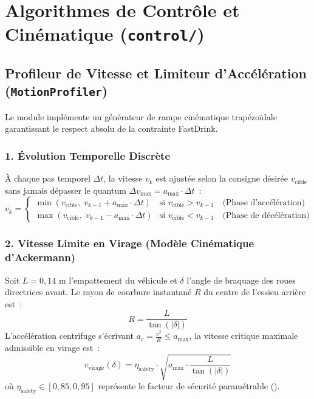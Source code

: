 \section{Algorithmes de Contrôle et Cinématique (\texttt{control/})}

\subsection{Profileur de Vitesse et Limiteur d'Accélération (\texttt{MotionProfiler})}
Le module  implémente un générateur de rampe cinématique trapézoïdale garantissant le respect absolu de la contrainte FastDrink. 

\subsubsection{1. Évolution Temporelle Discrète}
À chaque pas temporel $\Delta t$, la vitesse $v_k$ est ajustée selon la consigne désirée $v_{\text{cible}}$ sans jamais dépasser le quantum $\Delta v_{\max} = a_{\max} \cdot \Delta t$~:
\begin{equation}
    v_k = \begin{cases}
        \min(v_{\text{cible}}, \; v_{k-1} + a_{\max} \cdot \Delta t) & \text{si } v_{\text{cible}} > v_{k-1} \quad \text{(Phase d'accélération)} \\
        \max(v_{\text{cible}}, \; v_{k-1} - a_{\max} \cdot \Delta t) & \text{si } v_{\text{cible}} < v_{k-1} \quad \text{(Phase de décélération)}
    \end{cases}
\end{equation}

\subsubsection{2. Vitesse Limite en Virage (Modèle Cinématique d'Ackermann)}
Soit $L = 0{,}14\text{ m}$ l'empattement du véhicule et $\delta$ l'angle de braquage des roues directrices avant. Le rayon de courbure instantané $R$ du centre de l'essieu arrière est~:
\begin{equation}
    R = \frac{L}{\tan(|\delta|)}
\end{equation}
L'accélération centrifuge s'écrivant $a_c = \frac{v^2}{R} \le a_{\max}$, la vitesse critique maximale admissible en virage est~:
\begin{equation}
    v_{\text{virage}}(\delta) = \eta_{\text{safety}} \cdot \sqrt{a_{\max} \cdot \frac{L}{\tan(|\delta|)}}
\end{equation}
où $\eta_{\text{safety}} \in [0{,}85, 0{,}95]$ représente le facteur de sécurité paramétrable ().

